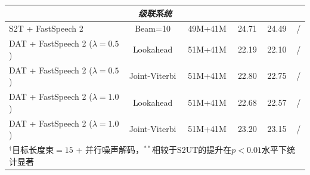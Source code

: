 \begin{table}[t]
{\begin{tabular}{lccccc}
        \midrule
        \multicolumn{6}{c}{\textit{级联系统}} \\
        \midrule
        S2T + FastSpeech 2                        & Beam=10         & 49M+41M & 24.71 & 24.49 & /  \\
        DAT + FastSpeech 2 ($\lambda=0.5$)        & Lookahead       & 51M+41M & 22.19 & 22.10 & /  \\
        DAT + FastSpeech 2 ($\lambda=0.5$)        & Joint-Viterbi   & 51M+41M & 22.80 & 22.75 & /  \\
        DAT + FastSpeech 2 ($\lambda=1.0$)        & Lookahead       & 51M+41M & 22.68 & 22.57 & /  \\
        DAT + FastSpeech 2 ($\lambda=1.0$)        & Joint-Viterbi   & 51M+41M & 23.20 & 23.15 & /  \\
        \bottomrule
        \multicolumn{6}{l}{\scriptsize $^\dag$目标长度束$=15$ + 并行噪声解码，$^{**}$相较于S2UT的提升在$p<0.01$水平下统计显著}
    \end{tabular}}
\end{table}
